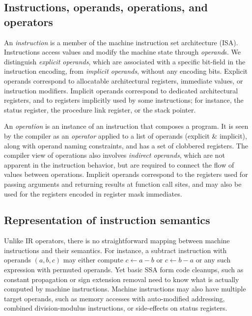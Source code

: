 \subsection{Instructions, operands, operations, and operators}

An \emph{instruction} is a member of the machine instruction set architecture
(ISA). Instructions access values and modify the machine state through
\emph{operand}s. We distinguish \emph{explicit operands}, which are associated
with a specific bit-field in the instruction encoding, from \emph{implicit
operands}, without any encoding bits.  Explicit operands correspond to
allocatable architectural registers, immediate values, or instruction modifiers.
Implicit operands correspond to dedicated architectural registers,
and to registers implicitly used by some instructions; for instance, the
status register, the procedure link register, or the stack pointer.

An \emph{operation} is an instance of an instruction that composes a program. It
is seen by the compiler as an \emph{operator} applied to a list of operands
(explicit \& implicit), along with operand naming constraints, and has a set of
clobbered registers. The compiler view of operations also involves
\emph{indirect operands}, which are not apparent in the instruction behavior,
but are required to connect the flow of values between operations.  Implicit
operands correspond to the registers used for passing arguments and returning
results at function call sites, and may also be used for the registers
encoded in register mask immediates.


\subsection{Representation of instruction semantics}

Unlike IR operators, there is no straightforward mapping between machine
instructions and their semantics. For instance, a subtract instruction with
operands $(a,b,c)$ may either compute $c \leftarrow a-b$ or $c \leftarrow b-a$
or any such expression with permuted operands. Yet basic SSA form code cleanups,
such as constant propagation or sign extension removal need to know what is
actually computed by machine instructions. Machine instructions may also have
multiple target operands, such as memory accesses with auto-modified addressing,
combined division-modulus instructions, or side-effects on status registers.

